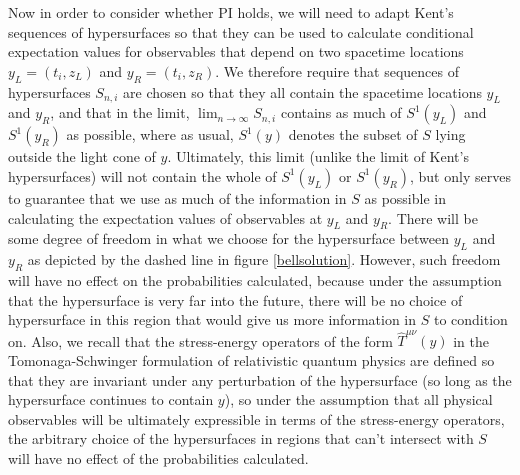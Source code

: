 Now in order to consider whether PI holds, we will need to adapt Kent's sequences of hypersurfaces so that they can be used to calculate conditional expectation values for observables that depend on two spacetime locations %
% 
$y_L=(t_i, z_L)$ and $y_R=(t_i,z_R)$.%
%
  We therefore require that sequences of hypersurfaces $S_{n,i}$ are chosen so that they all contain the spacetime locations $y_L$ and $y_R$, and that in the limit, $\lim_{n\rightarrow\infty}S_{n,i}$ contains as much of $S^1(y_L)$ and $S^1(y_R)$ as possible, where as usual, $S^1(y)$ denotes the subset of $S$ lying outside the light cone of $y$. Ultimately, this limit (unlike the limit of Kent's hypersurfaces) will not contain the whole of $S^1(y_L)$ or $S^1(y_R)$, but only serves to guarantee that we use as much of the information in $S$ as possible in calculating the expectation values of observables at $y_L$ and $y_R$. There will be some degree of freedom in what we choose for the hypersurface between $y_L$ and $y_R$ as depicted by the dashed line in figure \ref{bellsolution}. However, such freedom will have no effect on the probabilities calculated, because under the assumption that the hypersurface is very far into the future, there will be no choice of hypersurface in this region that would give us more information in $S$ to condition on. Also, we recall that the stress-energy operators of the form $\hat{T}^{\mu\nu}(y)$ in the Tomonaga-Schwinger formulation of relativistic quantum physics are defined so that they are invariant under any perturbation of the hypersurface (so long as the hypersurface continues to contain $y$), so under the assumption that all physical observables will be ultimately expressible in terms of the stress-energy operators, the arbitrary choice of the hypersurfaces in regions that can't intersect with $S$ will have no effect of the probabilities calculated. 

